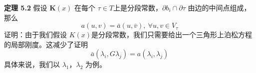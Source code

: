 \documentclass[12pt,a4paper]{article}
\begin{document}
\textbf{定理 5.2}
假设 $\textbf{K}(x)$ 在每个 $\tau\in T$上是分段常数，$\partial b_i \cap\partial\tau$ 由边的中间点组成，那么
$$
a(u,v)=\bar{a}(u,\bar{v}),~\forall u,v\in V_{\tau}
$$ 
证明：由于我们假设 $K(x)$是分段常数，我们只需要给出一个三角形上泊松方程的局部刚度。这减少了证明
$$
\bar{a}(\lambda_i,G\lambda_j)=a(\lambda_i,\lambda_j)
$$
具体来说，我们以 $\lambda_1$，$\lambda_2$ 为例。












































































































































%

%
\end{document}
